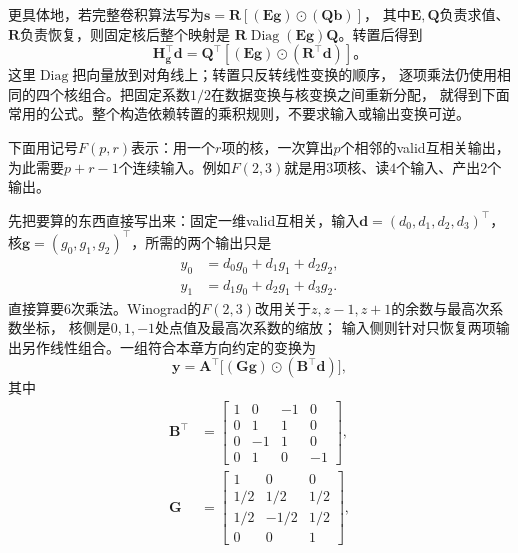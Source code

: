 更具体地，若完整卷积算法写为$\bm s=\bm R[(\bm E\bm g)\odot(\bm Q\bm b)]$，
其中$\bm E,\bm Q$负责求值、$\bm R$负责恢复，则固定核后整个映射是
$\bm R\operatorname{Diag}(\bm E\bm g)\bm Q$。转置后得到
\[
  \bm H_{\bm g}^\top\bm d
    =\bm Q^\top[(\bm E\bm g)\odot(\bm R^\top\bm d)]\text{。}
\]
这里$\operatorname{Diag}$把向量放到对角线上；转置只反转线性变换的顺序，
逐项乘法仍使用相同的四个核组合。把固定系数$1/2$在数据变换与核变换之间重新分配，
就得到下面常用的公式。整个构造依赖转置的乘积规则，不要求输入或输出变换可逆。

下面用记号$F(p,r)$表示：用一个$r$项的核，一次算出$p$个相邻的valid互相关输出，
为此需要$p+r-1$个连续输入。例如$F(2,3)$就是用$3$项核、读$4$个输入、产出$2$个输出。

\begin{example}
  \label{ex:signal-analysis-winograd-f23}
  先把要算的东西直接写出来：固定一维valid互相关，输入$\bm d=(d_0,d_1,d_2,d_3)^\top$，
  核$\bm g=(g_0,g_1,g_2)^\top$，所需的两个输出只是
  \begin{align*}
    y_0&=d_0g_0+d_1g_1+d_2g_2,\\
    y_1&=d_1g_0+d_2g_1+d_3g_2.
  \end{align*}
  直接算要$6$次乘法。Winograd的$F(2,3)$改用关于$z,z-1,z+1$的余数与最高次系数坐标，
  核侧是$0,1,-1$处点值及最高次系数的缩放；
  输入侧则针对只恢复两项输出另作线性组合。一组符合本章方向约定的变换为
  \begin{equation}
    \bm y=\bm A^\top\bigl[(\bm G\bm g)\odot(\bm B^\top\bm d)\bigr],
    \label{eq:signal-analysis-winograd-f23}
  \end{equation}
\BookEquationAliases{\label{eq:cnn-winograd-matrix-a}
\label{eq:cnn-winograd-matrices-bg}
\label{eq:cnn-winograd-recovery-principle}
\label{eq:cnn-winograd-one-dimensional}
\label{eq:cnn-winograd-vector-transform}}
  其中
  \begin{align*}
    \bm B^\top&=\begin{bmatrix}
      1&0&-1&0\\0&1&1&0\\0&-1&1&0\\0&1&0&-1
    \end{bmatrix},\\
    \bm G&=\begin{bmatrix}
      1&0&0\\1/2&1/2&1/2\\1/2&-1/2&1/2\\0&0&1
    \end{bmatrix},\\

\end{align*}
\end{example}

